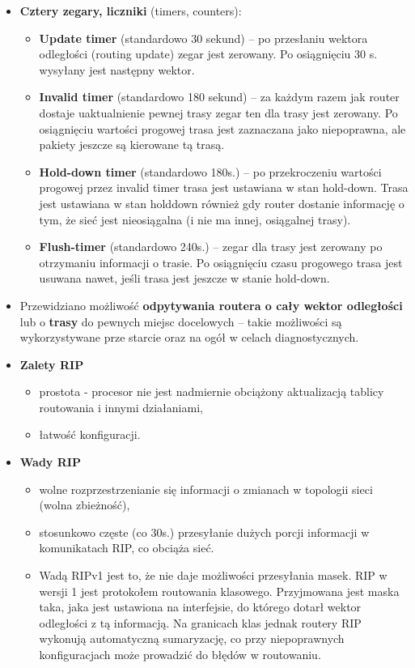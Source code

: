 \documentclass[../main.tex]{subfiles}
\begin{document}
\begin{itemize}
        \item \textbf{Cztery zegary, liczniki} (timers, counters):
        \begin{itemize}
            \item \textbf{Update timer} (standardowo 30 sekund) – po przesłaniu wektora odległości
            (routing update) zegar jest zerowany. Po osiągnięciu 30 s. wysyłany jest następny wektor.
            \item \textbf{Invalid timer} (standardowo 180 sekund) – za każdym razem jak router dostaje uaktualnienie pewnej trasy zegar ten dla trasy jest zerowany. Po osiągnięciu wartości progowej trasa jest zaznaczana jako niepoprawna, ale pakiety jeszcze są kierowane tą trasą.
            \item \textbf{Hold-down timer} (standardowo 180s.) – po przekroczeniu wartości progowej
            przez invalid timer trasa jest ustawiana w stan hold-down. Trasa jest ustawiana w stan holddown również gdy router dostanie informację o tym, że sieć jest nieosiągalna (i nie ma innej, osiągalnej trasy).
            \item \textbf{Flush-timer} (standardowo 240s.) – zegar dla trasy jest zerowany po otrzymaniu informacji o trasie. Po osiągnięciu czasu progowego trasa jest usuwana nawet, jeśli trasa jest jeszcze w stanie hold-down.
        \end{itemize}

        \item Przewidziano możliwość \textbf{odpytywania routera o cały wektor odległości} lub o \textbf{trasy} do pewnych miejsc docelowych – takie możliwości są wykorzystywane prze starcie oraz na ogół w celach diagnostycznych.\\

        \item \textbf{Zalety RIP}
        \begin{itemize}
            \item prostota - procesor nie jest nadmiernie obciążony aktualizacją tablicy routowania i innymi działaniami,
            \item łatwość konfiguracji.
        \end{itemize}

        \item \textbf{Wady RIP}
        \begin{itemize}
            \item wolne rozprzestrzenianie się informacji o zmianach w topologii sieci (wolna zbieżność),
            \item stosunkowo częste (co 30s.) przesyłanie dużych porcji informacji w komunikatach RIP, co obciąża sieć.
            \item Wadą RIPv1 jest to, że nie daje możliwości przesyłania masek. RIP w wersji 1 jest protokołem routowania klasowego. Przyjmowana jest maska taka, jaka jest ustawiona na interfejsie, do którego dotarł wektor odległości z tą informacją. Na granicach klas jednak routery RIP wykonują automatyczną sumaryzację, co przy niepoprawnych konfiguracjach może prowadzić do błędów w routowaniu.
        \end{itemize}


\end{itemize}
\end{document}
